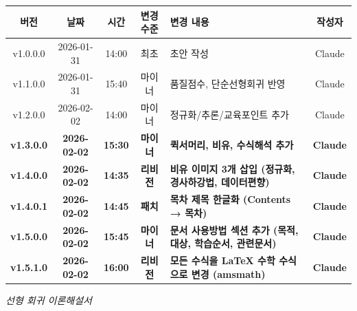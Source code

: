 \documentclass[11pt,a4paper]{article}
\begin{document}
\begin{center}
\renewcommand{\arraystretch}{1.3}
\begin{tabular}{|c|c|c|c|p{4.5cm}|c|}
\hline
\rowcolor{tableheader}
\textbf{버전} & \textbf{날짜} & \textbf{시간} & \textbf{변경 수준} & \textbf{변경 내용} & \textbf{작성자} \\
\hline
v1.0.0.0 & 2026-01-31 & 14:00 & 최초 & 초안 작성 & Claude \\
\hline
v1.1.0.0 & 2026-01-31 & 15:40 & 마이너 & 품질점수, 단순선형회귀 반영 & Claude \\
\hline
v1.2.0.0 & 2026-02-02 & 14:00 & 마이너 & 정규화/추론/교육포인트 추가 & Claude \\
\hline
\textbf{v1.3.0.0} & \textbf{2026-02-02} & \textbf{15:30} & \textbf{마이너} & \textbf{퀵서머리, 비유, 수식해석 추가} & \textbf{Claude} \\
\hline
\textbf{v1.4.0.0} & \textbf{2026-02-02} & \textbf{14:35} & \textbf{리비전} & \textbf{비유 이미지 3개 삽입 (정규화, 경사하강법, 데이터편향)} & \textbf{Claude} \\
\hline
\textbf{v1.4.0.1} & \textbf{2026-02-02} & \textbf{14:45} & \textbf{패치} & \textbf{목차 제목 한글화 (Contents → 목차)} & \textbf{Claude} \\
\hline
\textbf{v1.5.0.0} & \textbf{2026-02-02} & \textbf{15:45} & \textbf{마이너} & \textbf{문서 사용방법 섹션 추가 (목적, 대상, 학습순서, 관련문서)} & \textbf{Claude} \\
\hline
\textbf{v1.5.1.0} & \textbf{2026-02-02} & \textbf{16:00} & \textbf{리비전} & \textbf{모든 수식을 LaTeX 수학 수식으로 변경 (amsmath)} & \textbf{Claude} \\
\hline
\end{tabular}
\end{center}

\vspace{2cm}

\begin{center}
\textit{\color{lightbrown} 선형 회귀 이론해설서}
\end{center}
\end{document}
